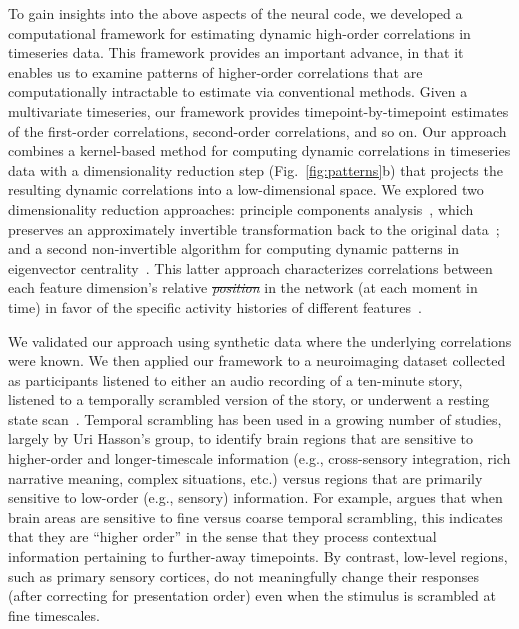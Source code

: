 \documentclass[english]{article}
\providecommand{\DIFaddtex}[1]{{\protect\color{blue}\uwave{#1}}} %
\providecommand{\DIFdeltex}[1]{{\protect\color{red}\sout{#1}}}                      %
\providecommand{\DIFaddbegin}{} %
\providecommand{\DIFaddend}{} %
\providecommand{\DIFdelbegin}{} %
\providecommand{\DIFdelend}{} %
\providecommand{\DIFadd}[1]{\texorpdfstring{\DIFaddtex{#1}}{#1}} %
\providecommand{\DIFdel}[1]{\texorpdfstring{\DIFdeltex{#1}}{}} %
\newcommand{\DIFscaledelfig}{0.5}
\newlength{\DIFdelgraphicswidth} %
\newlength{\DIFdelgraphicsheight} %
\newcommand{\DIFaddincludegraphics}[2][]{{\color{blue}\fbox{\DIFOincludegraphics[#1]{#2}}}} %
\newcommand{\DIFdelincludegraphics}[2][]{%
\sbox{\DIFdelgraphicsbox}{\DIFOincludegraphics[#1]{#2}}%
\settoboxwidth{\DIFdelgraphicswidth}{\DIFdelgraphicsbox} %
\settoboxtotalheight{\DIFdelgraphicsheight}{\DIFdelgraphicsbox} %
\scalebox{\DIFscaledelfig}{%
\parbox[b]{\DIFdelgraphicswidth}{\usebox{\DIFdelgraphicsbox}\\[-\baselineskip] \rule{\DIFdelgraphicswidth}{0em}}\llap{\resizebox{\DIFdelgraphicswidth}{\DIFdelgraphicsheight}{%
\setlength{\unitlength}{\DIFdelgraphicswidth}%
\begin{picture}(1,1)%
\thicklines\linethickness{2pt} %
{\color[rgb]{1,0,0}\put(0,0){\framebox(1,1){}}}%
{\color[rgb]{1,0,0}\put(0,0){\line( 1,1){1}}}%
{\color[rgb]{1,0,0}\put(0,1){\line(1,-1){1}}}%
\end{picture}%
}\hspace*{3pt}}} %
} %
\DeclareRobustCommand{\DIFaddbegin}{\DIFOaddbegin \let\includegraphics\DIFaddincludegraphics} %
\DeclareRobustCommand{\DIFaddend}{\DIFOaddend \let\includegraphics\DIFOincludegraphics} %
\DeclareRobustCommand{\DIFdelbegin}{\DIFOdelbegin \let\includegraphics\DIFdelincludegraphics} %
\DeclareRobustCommand{\DIFdelend}{\DIFOaddend \let\includegraphics\DIFOincludegraphics} %
\begin{document}
To gain insights into the above aspects of the neural code, we
developed a computational framework for estimating dynamic high-order
correlations in timeseries data. This framework provides an important
advance, in that it enables us to examine patterns of higher-order
correlations that are computationally intractable to estimate via
conventional methods.  Given a multivariate timeseries, our framework
provides timepoint-by-timepoint estimates of the first-order
correlations, second-order correlations, and so on.  Our approach
combines a kernel-based method for computing dynamic correlations in
timeseries data with a dimensionality reduction step
(Fig.~\ref{fig:patterns}b) that projects the resulting dynamic
correlations into a low-dimensional space.  We explored two
dimensionality reduction approaches: principle components
analysis~\citep[PCA;][]{Pear01}, which preserves an approximately
invertible transformation back to the original data~\citep[e.g., this
follows related approaches taken by][]{McInJirs19, TokeSomm19,
  GonzEtal19}; and a second non-invertible algorithm for computing
dynamic patterns in eigenvector centrality~\citep{Land95}.  This
latter approach characterizes correlations between each feature
dimension's relative \DIFdelbegin \textit{\DIFdel{position}} %
\DIFdelend \DIFaddbegin \DIFadd{position }\DIFaddend in the network (at each moment
in time) in favor of the specific activity histories of different
features~\citep[also see][]{BetzEtal19, SizeEtal18, ReimEtal17}.

We validated our approach using synthetic data where the underlying
correlations were known.  We then applied our framework to a
neuroimaging dataset collected as participants listened to either an
audio recording of a ten-minute story, listened to a temporally
scrambled version of the story, or underwent a resting state
scan~\citep{SimoEtal16}.  Temporal scrambling has been used in a
growing number of studies, largely by Uri Hasson's group, to identify
brain regions that are sensitive to higher-order and longer-timescale
information (e.g., cross-sensory integration, rich narrative meaning,
complex situations, etc.) versus regions that are primarily sensitive
to low-order (e.g., sensory) information.  For example,
\cite{HassEtal08} argues that when brain areas are sensitive to fine
versus coarse temporal scrambling, this indicates that they are
``higher order'' in the sense that they process contextual information
pertaining to further-away timepoints.  By contrast, low-level
regions, such as primary sensory cortices, do not meaningfully change
their responses (after correcting for presentation order) even when
the stimulus is scrambled at fine timescales.
\end{document}
